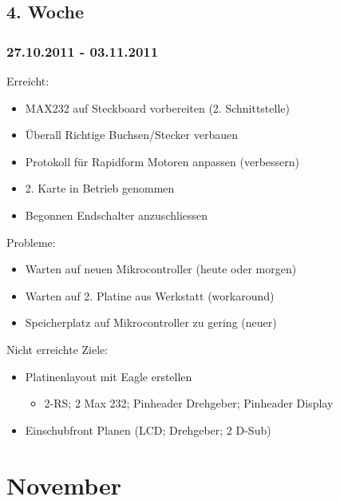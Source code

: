 \documentclass[ngerman]{beamer}
\begin{document}
\subsection{4. Woche}
\begin{frame}\frametitle{27.10.2011 - 03.11.2011}
Erreicht: 
\begin{itemize}
\item MAX232 auf Steckboard vorbereiten (2. Schnittstelle) 
\item Überall Richtige Buchsen/Stecker verbauen 
\item Protokoll für Rapidform Motoren anpassen (verbessern) 
\item 2. Karte in Betrieb genommen 
\item Begonnen Endschalter anzuschliessen 
\end{itemize}
Probleme: 
\begin{itemize}
\item Warten auf neuen Mikrocontroller (heute oder morgen) 
\item Warten auf 2. Platine aus Werkstatt (workaround) 
\item Speicherplatz auf Mikrocontroller zu gering (neuer) 
\end{itemize}
Nicht erreichte Ziele: 
\begin{itemize}
\item Platinenlayout mit Eagle erstellen 

\begin{itemize}
\item 2-RS; 2 Max 232; Pinheader Drehgeber; Pinheader Display 
\end{itemize}
\item Einschubfront Planen (LCD; Drehgeber; 2 D-Sub)
\end{itemize}
\end{frame}
\section{November}
\end{document}
